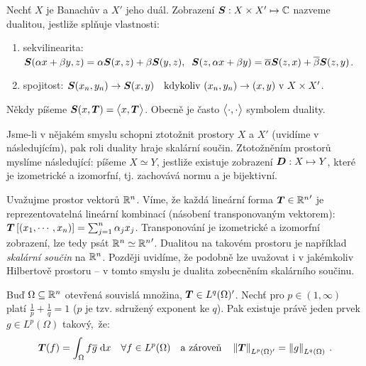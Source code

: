 \begin{definition}[Dualita]
Nechť $X$ je Banachův a $X'$ jeho duál. Zobrazení $\boldsymbol{S} : X \times X' \mapsto \mathbb{C}$ nazveme dualitou, jestliže splňuje vlastnosti: \begin{enumerate}
    \item sekvilinearita: $\boldsymbol{S}(\alpha x + \beta y, z) = \alpha \boldsymbol{S}(x,z) + \beta \boldsymbol{S}(y,z), \;\; \boldsymbol{S}(z,\alpha x + \beta y) = \overline{\alpha} \boldsymbol{S}(z,x) + \overline{\beta} \boldsymbol{S}(z,y)$.
    
    \item spojitost: $\boldsymbol{S}(x_n,y_n) \rightarrow \boldsymbol{S}(x,y) \quad \text{kdykoliv } (x_n,y_n) \rightarrow (x,y) \text{ v } X \times X'$.
\end{enumerate}
Někdy píšeme $\boldsymbol{S}(x, \boldsymbol{T}) = \big< x, \boldsymbol{T} \big>$. Obecně je často $\big< \cdot, \cdot \big>$ symbolem duality.
\end{definition}

\begin{remark}
Jsme-li v nějakém smyslu schopni ztotožnit prostory $X$ a $X'$ (uvidíme v následujícím), pak roli duality hraje skalární součin. Ztotožněním prostorů myslíme následující: píšeme $X \simeq Y$, jestliže existuje zobrazení $\boldsymbol{D}: X \mapsto Y$, které je izometrické a izomorfní, tj. zachovává normu a je bijektivní.
\end{remark}

\begin{example}

Uvažujme prostor vektorů $\mathbb{R}^n$. Víme, že každá lineární forma $\boldsymbol{T} \in {\mathbb{R}^n}'$ je reprezentovatelná lineární kombinací (násobení transponovaným vektorem): $\boldsymbol{T} \left[ (x_1, \cdots, x_n) \right] = \sum_{j=1}^n \alpha_j x_j$. Transponování je izometrické a izomorfní zobrazení, lze tedy psát $\mathbb{R}^n \simeq {\mathbb{R}^n}'$. Dualitou na takovém prostoru je například \textit{skalární součin} na $\mathbb{R}^n$. Později uvidíme, že podobně lze uvažovat i v jakémkoliv Hilbertově prostoru – v tomto smyslu je dualita zobecněním skalárního součinu.
\end{example}

\begin{theorem}
Buď $\Omega \subseteq \mathbb{R}^n $ otevřená souvislá množina, $\boldsymbol{T} \in L^q(\Omega)'$. Nechť pro $p \in (1, \infty)$ platí $\frac{1}{p} + \frac{1}{q} =1$ ($p$ je tzv. sdružený exponent ke $q$). Pak existuje právě jeden prvek $g \in L^p(\Omega)$ takový,~že:
$$
\boldsymbol{T}(f) = \int_\Omega f \overline{g} \;\mathrm{d}x \quad \forall f \in L^p(\Omega)
\quad \text{a zároveň} \quad
\left\lVert\boldsymbol{T}\right\rVert_{L^p(\Omega)'} = \left\lVert g\right\rVert_{L^q(\Omega)} \:.
$$

\end{theorem}

